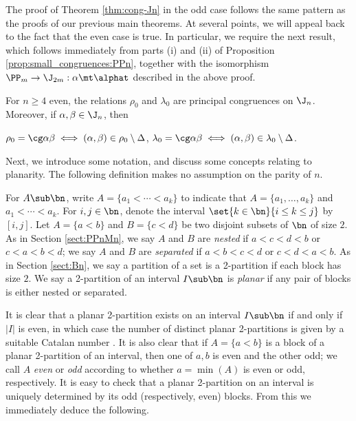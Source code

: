 The proof of Theorem \ref{thm:cong-Jn} in the odd case follows the same pattern as the proofs of our previous main theorems.  At several points, we will appeal back to the fact that the even case is true.  In particular, we require the next result, which follows immediately from parts (i) and (ii) of Proposition \ref{prop:small_congruences:PPn}, together with the isomorphism $\PP_m\to\J_{2m}:\alpha\mt\alphat$ described in the above proof.

\newpage

\begin{proposition}
\label{prop:rlJeven}
For $n\geq4$ even, the relations $\rho_0$ and $\lambda_0$ are principal congruences on $\J_n$.  Moreover, if $\alpha,\beta\in\J_n$, then
\begin{itemize}\begin{multicols}{2}
 $\rho_0=\cg\alpha\beta\iff (\alpha,\beta)\in\rho_0\setminus\Delta$,
 $\lambda_0=\cg\alpha\beta\iff (\alpha,\beta)\in\lambda_0\setminus\Delta$.
\epfres
\end{multicols}\end{itemize}
\end{proposition}



Next, we introduce some notation, and discuss some concepts relating to planarity.  The following definition makes no assumption on the parity of $n$.

\begin{definition}
For $A\sub\bn$, write $A=\{a_1<\cdots<a_k\}$ to indicate that $A=\{a_1,\ldots,a_k\}$ and $a_1<\cdots<a_k$.  For $i,j\in\bn$, denote the interval $\set{k\in\bn}{i\leq k\leq j}$ by~$[i,j]$.
%
Let $A=\{a<b\}$ and $B=\{c<d\}$ be two disjoint subsets of $\bn$ of size $2$.  As in Section \ref{sect:PPnMn}, we say $A$ and $B$ are \emph{nested} if $a<c<d<b$ or $c<a<b<d$; we say $A$ and $B$ are \emph{separated} if $a<b<c<d$ or $c<d<a<b$.  As in Section \ref{sect:Bn}, we say a partition of a set is a 2-partition if each block has size $2$.  We say a 2-partition of an interval $I\sub\bn$ is \emph{planar} if any pair of blocks is either nested or separated.
\end{definition}


It is clear that a planar 2-partition exists on an interval $I\sub\bn$ if and only if $|I|$ is even, in which case the number of distinct planar 2-partitions is given by a suitable Catalan number \cite[Sequence A000108]{OEIS}.
It is also clear that if $A=\{a<b\}$ is a block of a planar 2-partition of an interval, then one of $a,b$ is even and the other odd;
%
we call $A$ \emph{even} or \emph{odd} according to whether $a=\min(A)$ is even or odd, respectively.
It is easy to check that a planar 2-partition on an interval is uniquely determined by its odd (respectively, even) blocks.
%
From this we immediately deduce the following.


